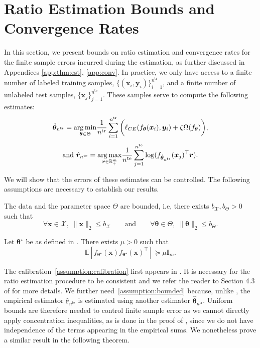 \section{Ratio Estimation Bounds and Convergence Rates }\label{sec:theory_guarantee}


In this section, we present bounds on ratio estimation and convergence rates for the finite sample errors incurred during the estimation, as further discussed in Appendices \ref{app:thm:est}, \ref{app:conv}. In practice, we only have access to a finite number of labeled training samples, $\{(\boldsymbol{x}_i, \boldsymbol{y}_i)\}_{i=1}^{{n}^{\text{tr}}}$, and a finite number of unlabeled test samples, $\{\boldsymbol{x}_j\}_{j=1}^{{n}^{\text{te}}}$. These samples serve to compute the following estimates:\\ 
\[{\hat{\boldsymbol{\theta}}}_{{n}^{\text{tr}}} = \underset{\boldsymbol{\theta} \in \Theta}{\operatorname*{arg\,min}} \frac{1}{{n}^{\text{tr}}}\sum_{i=1}^{{n}^{\text{tr}}}\bigg(\ell_{CE}(f_{\boldsymbol{\theta}}(\boldsymbol{x}_i), \boldsymbol{y}_i) + \zeta\Omega(f_{\boldsymbol{\theta}})\bigg),\] 
\[\text{and  } {\hat{\boldsymbol{r}}}_{{n}^{\text{te}}} = \underset{\boldsymbol{r} \in \mathbb{R}_{+}^m}{\operatorname*{arg\,max}} \frac{1}{{n}^{\text{te}}}\sum_{j=1}^{{n}^{\text{te}}}\log (f_{{\hat{\boldsymbol{\theta}}}_{{n}^{\text{tr}}}}(\boldsymbol{x}_j)^\top \boldsymbol{r}).\]

We will show that the errors of these estimates can be controlled. The following assumptions are necessary to establish our results.

\begin{assumption}[Boundedness]\label{assumption:bounded}
The data and the parameter space $\Theta$ are bounded, i.e, there exists $b_\mathcal{X}, b_\Theta > 0$ such that
\[
\forall \boldsymbol{x} \in \mathcal{X},\; \|\boldsymbol{x}\|_2 \leq b_\mathcal{X} \quad \quad \text{and} \quad \quad \forall \boldsymbol{\theta} \in \Theta,\; \|\boldsymbol{\theta}\|_2 \leq b_\Theta.
\]
\end{assumption}
\begin{assumption}[Calibration]\label{assumption:calibration}
    Let $\boldsymbol{\theta}^\star$ be as defined in . There exists $\mu > 0$ such that
    \[
    \mathbb{E}\left[{f_{\boldsymbol{\theta}^\star}(\boldsymbol{x})f_{\boldsymbol{\theta}^\star}(\boldsymbol{x})^\top}\right] \succeq \mu \boldsymbol{I}_m.
    \]
\end{assumption}

The calibration~\cref{assumption:calibration} first appears in \citep{mlls}. 
It is necessary for the ratio estimation procedure to be consistent and we refer the reader to Section 4.3 of \citet{mlls} for more details. We further need~\cref{assumption:bounded} because, unlike \citep{mlls}, the empirical estimator $\hat{\boldsymbol{r}}_{{n}^{\text{te}}}$ is estimated using another estimator ${\hat{\boldsymbol{\theta}}}_{{n}^{\text{tr}}}$.
Uniform bounds are therefore needed to control finite sample error as we cannot directly apply concentration inequalities, as is done in the proof of \citep[Lemma 3]{mlls}, since we do not have independence of the terms appearing in the empirical sums. We nonetheless prove a similar result in the following theorem.

